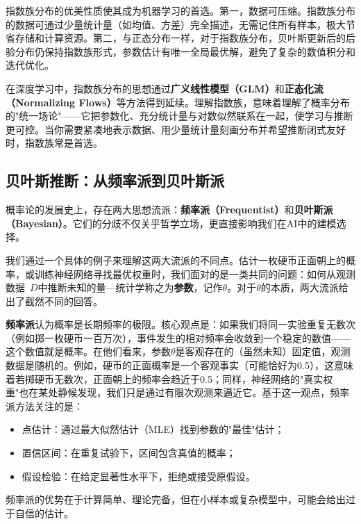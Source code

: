 指数族分布的优美性质使其成为机器学习的首选。第一，数据可压缩。指数族分布的数据可通过少量统计量（如均值、方差）完全描述，无需记住所有样本，极大节省存储和计算资源。第二，与正态分布一样，对于指数族分布，贝叶斯更新后的后验分布仍保持指数族形式，参数估计有唯一全局最优解，避免了复杂的数值积分和迭代优化。

在深度学习中，指数族分布的思想通过\textbf{广义线性模型（GLM）}和\textbf{正态化流（Normalizing Flows）}等方法得到延续。理解指数族，意味着理解了概率分布的"统一场论"——它把参数化、充分统计量与对数似然联系在一起，使学习与推断更可控。当你需要紧凑地表示数据、用少量统计量刻画分布并希望推断闭式友好时，指数族常是首选。
\subsection{贝叶斯推断：从频率派到贝叶斯派}

概率论的发展史上，存在两大思想流派：\textbf{频率派（Frequentist）}和\textbf{贝叶斯派（Bayesian）}。它们的分歧不仅关乎哲学立场，更直接影响我们在AI中的建模选择。

我们通过一个具体的例子来理解这两大流派的不同点。估计一枚硬币正面朝上的概率，或训练神经网络寻找最优权重时，我们面对的是一类共同的问题：如何从观测数据~$D$中推断未知的量---统计学称之为\textbf{参数}，记作$\theta$。对于$\theta$的本质，两大流派给出了截然不同的回答。

\textbf{频率派}认为概率是长期频率的极限。核心观点是：如果我们将同一实验重复无数次（例如掷一枚硬币一百万次），事件发生的相对频率会收敛到一个稳定的数值——这个数值就是概率。在他们看来，参数$\theta$是客观存在的（虽然未知）固定值，观测数据是随机的。例如，硬币的正面概率是一个客观事实（可能恰好为0.5），这意味着若掷硬币无数次，正面朝上的频率会趋近于0.5；同样，神经网络的"真实权重"也在某处静候发现，我们只是通过有限次观测来逼近它。基于这一观点，频率派方法关注的是：
\begin{itemize}
  \item 点估计：通过最大似然估计（MLE）找到参数的"最佳"估计；
  \item 置信区间：在重复试验下，区间包含真值的概率；
  \item 假设检验：在给定显著性水平下，拒绝或接受原假设。
\end{itemize}
频率派的优势在于计算简单、理论完备，但在小样本或复杂模型中，可能会给出过于自信的估计。


